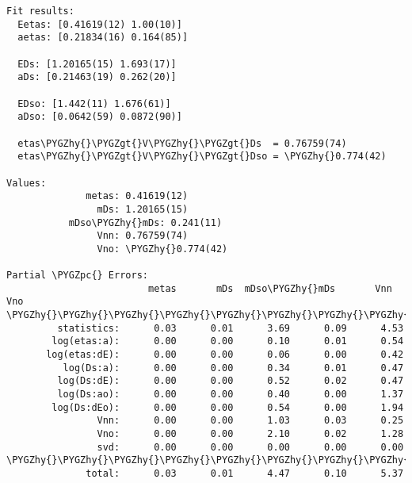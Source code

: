 \documentclass[letterpaper,10pt,english]{sphinxmanual}
\def\PYGZgt{\char`\>}
\def\PYGZpc{\char`\%}
\def\PYGZhy{\char`\-}
\begin{document}
\begin{itemize}
\begin{Verbatim}[commandchars=\\\{\}]
Fit results:
  Eetas: [0.41619(12) 1.00(10)]
  aetas: [0.21834(16) 0.164(85)]

  EDs: [1.20165(15) 1.693(17)]
  aDs: [0.21463(19) 0.262(20)]

  EDso: [1.442(11) 1.676(61)]
  aDso: [0.0642(59) 0.0872(90)]

  etas\PYGZhy{}\PYGZgt{}V\PYGZhy{}\PYGZgt{}Ds  = 0.76759(74)
  etas\PYGZhy{}\PYGZgt{}V\PYGZhy{}\PYGZgt{}Dso = \PYGZhy{}0.774(42)

Values:
              metas: 0.41619(12)         
                mDs: 1.20165(15)         
           mDso\PYGZhy{}mDs: 0.241(11)           
                Vnn: 0.76759(74)         
                Vno: \PYGZhy{}0.774(42)          

Partial \PYGZpc{} Errors:
                         metas       mDs  mDso\PYGZhy{}mDs       Vnn       Vno
\PYGZhy{}\PYGZhy{}\PYGZhy{}\PYGZhy{}\PYGZhy{}\PYGZhy{}\PYGZhy{}\PYGZhy{}\PYGZhy{}\PYGZhy{}\PYGZhy{}\PYGZhy{}\PYGZhy{}\PYGZhy{}\PYGZhy{}\PYGZhy{}\PYGZhy{}\PYGZhy{}\PYGZhy{}\PYGZhy{}\PYGZhy{}\PYGZhy{}\PYGZhy{}\PYGZhy{}\PYGZhy{}\PYGZhy{}\PYGZhy{}\PYGZhy{}\PYGZhy{}\PYGZhy{}\PYGZhy{}\PYGZhy{}\PYGZhy{}\PYGZhy{}\PYGZhy{}\PYGZhy{}\PYGZhy{}\PYGZhy{}\PYGZhy{}\PYGZhy{}\PYGZhy{}\PYGZhy{}\PYGZhy{}\PYGZhy{}\PYGZhy{}\PYGZhy{}\PYGZhy{}\PYGZhy{}\PYGZhy{}\PYGZhy{}\PYGZhy{}\PYGZhy{}\PYGZhy{}\PYGZhy{}\PYGZhy{}\PYGZhy{}\PYGZhy{}\PYGZhy{}\PYGZhy{}\PYGZhy{}\PYGZhy{}\PYGZhy{}\PYGZhy{}\PYGZhy{}\PYGZhy{}\PYGZhy{}\PYGZhy{}\PYGZhy{}\PYGZhy{}\PYGZhy{}
         statistics:      0.03      0.01      3.69      0.09      4.53
        log(etas:a):      0.00      0.00      0.10      0.01      0.54
       log(etas:dE):      0.00      0.00      0.06      0.00      0.42
          log(Ds:a):      0.00      0.00      0.34      0.01      0.47
         log(Ds:dE):      0.00      0.00      0.52      0.02      0.47
         log(Ds:ao):      0.00      0.00      0.40      0.00      1.37
        log(Ds:dEo):      0.00      0.00      0.54      0.00      1.94
                Vnn:      0.00      0.00      1.03      0.03      0.25
                Vno:      0.00      0.00      2.10      0.02      1.28
                svd:      0.00      0.00      0.00      0.00      0.00
\PYGZhy{}\PYGZhy{}\PYGZhy{}\PYGZhy{}\PYGZhy{}\PYGZhy{}\PYGZhy{}\PYGZhy{}\PYGZhy{}\PYGZhy{}\PYGZhy{}\PYGZhy{}\PYGZhy{}\PYGZhy{}\PYGZhy{}\PYGZhy{}\PYGZhy{}\PYGZhy{}\PYGZhy{}\PYGZhy{}\PYGZhy{}\PYGZhy{}\PYGZhy{}\PYGZhy{}\PYGZhy{}\PYGZhy{}\PYGZhy{}\PYGZhy{}\PYGZhy{}\PYGZhy{}\PYGZhy{}\PYGZhy{}\PYGZhy{}\PYGZhy{}\PYGZhy{}\PYGZhy{}\PYGZhy{}\PYGZhy{}\PYGZhy{}\PYGZhy{}\PYGZhy{}\PYGZhy{}\PYGZhy{}\PYGZhy{}\PYGZhy{}\PYGZhy{}\PYGZhy{}\PYGZhy{}\PYGZhy{}\PYGZhy{}\PYGZhy{}\PYGZhy{}\PYGZhy{}\PYGZhy{}\PYGZhy{}\PYGZhy{}\PYGZhy{}\PYGZhy{}\PYGZhy{}\PYGZhy{}\PYGZhy{}\PYGZhy{}\PYGZhy{}\PYGZhy{}\PYGZhy{}\PYGZhy{}\PYGZhy{}\PYGZhy{}\PYGZhy{}\PYGZhy{}
              total:      0.03      0.01      4.47      0.10      5.37
\end{Verbatim}


\end{itemize}
\end{document}
